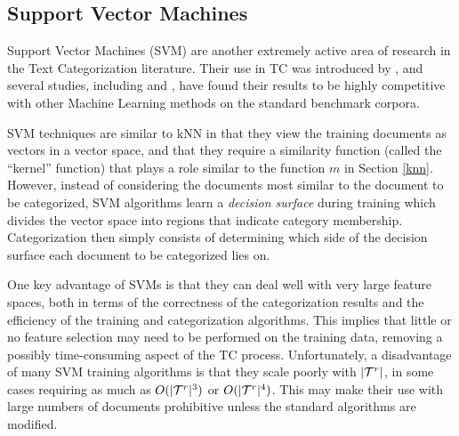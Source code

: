 \subsection{Support Vector Machines}

Support Vector Machines (SVM) are another extremely active area of
research in the Text Categorization literature.  Their use in TC was
introduced by \cite{joachims:98}, and several studies, including
\cite{joachims:98} and \cite{yang:99}, have found their results to be
highly competitive with other Machine Learning methods on the standard
benchmark corpora.

SVM techniques are similar to kNN in that they view the training
documents as vectors in a vector space, and that they require a
similarity function (called the ``kernel'' function) that plays a role
similar to the function $m$ in Section
\ref{knn}.\cite[ch. 1]{scholkopf:02} However, instead of considering
the documents most similar to the document to be categorized, SVM
algorithms learn a \emph{decision surface} during training which
divides the vector space into regions that indicate category
membership.  Categorization then simply consists of determining which
side of the decision surface each document to be categorized lies on.

One key advantage of SVMs is that they can deal well with very large
feature spaces, both in terms of the correctness of the categorization
results and the efficiency of the training and categorization
algorithms.  This implies that little or no feature selection may need
to be performed on the training data, removing a possibly
time-consuming aspect of the TC process.  Unfortunately, a
disadvantage of many SVM training algorithms is that they scale poorly
with $|\mathcal{T}^r|$, in some cases requiring as much as $O(|\mathcal{T}^r|^3)$ or
$O(|\mathcal{T}^r|^4)$.  This may make their use with large numbers of
documents prohibitive unless the standard algorithms are modified.



